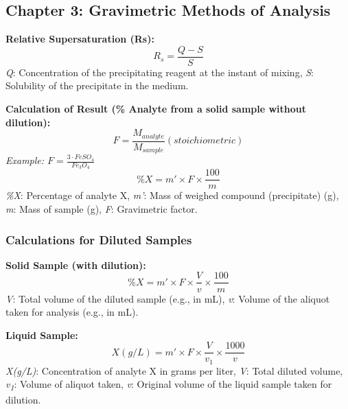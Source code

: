 \subsection*{Chapter 3: Gravimetric Methods of Analysis}

\textbf{Relative Supersaturation (Rs):}
\begin{equation}
R_s = \frac{Q-S}{S}
\end{equation}
\textit{Q}: Concentration of the precipitating reagent at the instant of mixing, \textit{S}: Solubility of the precipitate in the medium.

\vspace{5mm}

\textbf{Calculation of Result (\% Analyte from a solid sample without dilution):}
\begin{equation}
F = \frac{M_{analyte}}{M_{sample}} (stoichiometric)
\end{equation}
\textit{Example: $F = \frac{3 \cdot FeSO_4}{Fe_3O_4}$}
\begin{equation}
\%X = m' \times F \times \frac{100}{m}
\end{equation}
\textit{\%X}: Percentage of analyte X, \textit{m'}: Mass of weighed compound (precipitate) (g), \textit{m}: Mass of sample (g), \textit{F}: Gravimetric factor.

\vspace{5mm}

\subsubsection*{Calculations for Diluted Samples}

\textbf{Solid Sample (with dilution):}
\begin{equation}
\% X = m' \times F \times \frac{V}{v} \times \frac{100}{m}
\end{equation}
\textit{V}: Total volume of the diluted sample (e.g., in mL), \textit{v}: Volume of the aliquot taken for analysis (e.g., in mL).

\vspace{5mm}

\textbf{Liquid Sample:}
\begin{equation}
X(g/L) = m' \times F \times \frac{V}{v_1} \times \frac{1000}{v}
\end{equation}
\textit{X(g/L)}: Concentration of analyte X in grams per liter, \textit{V}: Total diluted volume, \textit{v\textsubscript{1}}: Volume of aliquot taken, \textit{v}: Original volume of the liquid sample taken for dilution.

